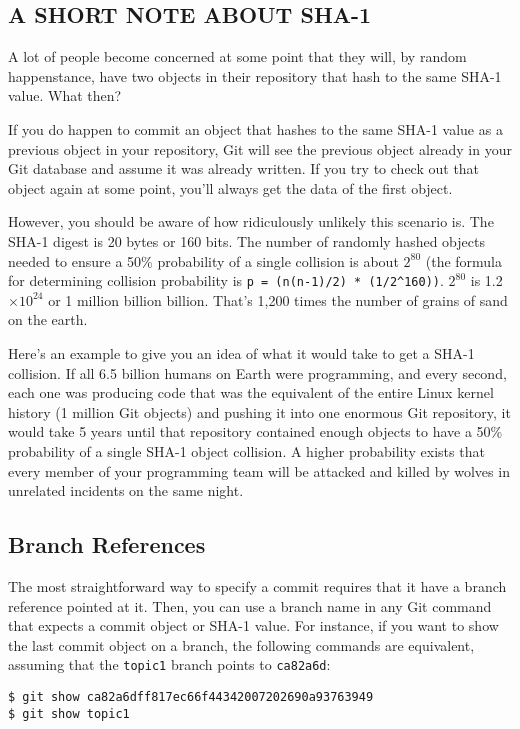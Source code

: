 \documentclass[a4paper]{book}
\newcounter{tab}[chapter]
\newcommand{\e}[1]{$ \times 10^{#1}$}
\begin{document}
\subsection{A SHORT NOTE ABOUT SHA-1}

A lot of people become concerned at some point that they will, by random happenstance, have two objects in their repository that hash to the same SHA-1 value. What then?

If you do happen to commit an object that hashes to the same SHA-1 value as a previous object in your repository, Git will see the previous object already in your Git database and assume it was already written. If you try to check out that object again at some point, you'll always get the data of the first object.

However, you should be aware of how ridiculously unlikely this scenario is. The SHA-1 digest is 20 bytes or 160 bits. The number of randomly hashed objects needed to ensure a 50\% probability of a single collision is about $2^{80}$ (the formula for determining collision probability is \texttt{p = (n(n-1)/2) * (1/2\^{}160))}. $2^{80}$ is 1.2\e{24} or 1 million billion billion. That's 1,200 times the number of grains of sand on the earth.

Here's an example to give you an idea of what it would take to get a SHA-1 collision. If all 6.5 billion humans on Earth were programming, and every second, each one was producing code that was the equivalent of the entire Linux kernel history (1 million Git objects) and pushing it into one enormous Git repository, it would take 5 years until that repository contained enough objects to have a 50\% probability of a single SHA-1 object collision. A higher probability exists that every member of your programming team will be attacked and killed by wolves in unrelated incidents on the same night.

\subsection{Branch References}

The most straightforward way to specify a commit requires that it have a branch reference pointed at it. Then, you can use a branch name in any Git command that expects a commit object or SHA-1 value. For instance, if you want to show the last commit object on a branch, the following commands are equivalent, assuming that the \texttt{topic1} branch points to \texttt{ca82a6d}:

\begin{shaded}\begin{verbatim}
$ git show ca82a6dff817ec66f44342007202690a93763949
$ git show topic1
\end{verbatim}\end{shaded}
\end{document}
